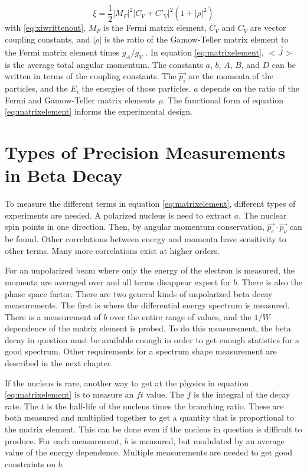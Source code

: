 \documentclass[../MaxHughesThesis.tex]{subfiles}
\begin{document}
\begin{equation}
	\xi = \frac{1}{2} |M_{F}|^{2} |C_{V} + C'_{V}|^{2} (1 + |\rho|^{2})
	\label{eq:xiwrittenout}
\end{equation}
with \ref{eq:xiwrittenout}, $M_{F}$ is the Fermi matrix element, $C_{V}$ and $C_{V}$ are vector coupling constants, and $|\rho|$ is the ratio of the Gamow-Teller matrix element to the Fermi matrix element times $g_{A}/g_{V}$ \cite{Gon19}.
In equation \ref{eq:matrixelement}, $<\vec{J}>$ is the average total angular momentum. 
The constants $a$, $b$, $A$, $B$, and $D$ can be written in terms of the coupling constants.
The $\vec{p_{i}}$ are the momenta of the particles, and the $E_{i}$ the energies of those particles.
$a$ depends on the ratio of the Fermi and Gamow-Teller matrix elements $\rho$.
The functional form of equation \ref{eq:matrixelement} informs the experimental design.

\section{Types of Precision Measurements in Beta Decay}
To measure the different terms in equation \ref{eq:matrixelement}, different types of experiments are needed.
A polarized nucleus is need to extract $a$. 
The nuclear spin points in one direction. 
Then, by angular momentum conservation, $\vec{p_{e}} \cdot \vec{p_{\nu}}$ can be found.
Other correlations between energy and momenta have sensitivity to other terms.
Many more correlations exist at higher orders.

For an unpolarized beam where only the energy of the electron is measured, the momenta are averaged over and all terms disappear expect for $b$.
There is also the phase space factor.
There are two general kinds of unpolarized beta decay measurements.
The first is where the differential energy spectrum is measured.
There is a measurement of $b$ over the entire range of values, and the $1/W$ dependence of the matrix element is probed.
To do this measurement, the beta decay in question must be available enough in order to get enough statistics for a good spectrum.
Other requirements for a spectrum shape measurement are described in the next chapter.

If the nucleus is rare, another way to get at the physics in equation \ref{eq:matrixelement} is to measure an $ft$ value.
The $f$ is the integral of the decay rate.
The $t$ is the half-life of the nucleus times the branching ratio.
These are both measured and multiplied together to get a quantity that is proportional to the matrix element.
This can be done even if the nucleus in question is difficult to produce.
For each measurement, $b$ is measured, but modulated by an average value of the energy dependence.
Multiple measurements are needed to get good constraints on $b$.
\end{document}
